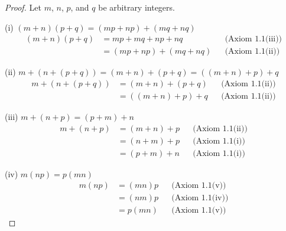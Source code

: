 \begin{proof}
    Let $m$, $n$, $p$, and $q$ be arbitrary integers.

    (i) $(m + n)(p + q) = (mp + np) + (mq + nq)$
    \begin{align*}
        (m + n)(p + q) & = mp + mq + np + nq     &  & \text{(Axiom 1.1(iii))} \\
                       & = (mp + np) + (mq + nq) &  & \text{(Axiom 1.1(ii))}
    \end{align*}

    (ii) $m + (n + (p + q)) = (m + n) + (p + q) = ((m + n) + p) + q$
    \begin{align*}
        m + (n + (p + q)) & = (m + n) + (p + q) &  & \text{(Axiom 1.1(ii))} \\
                          & = ((m + n) + p) + q &  & \text{(Axiom 1.1(ii))}
    \end{align*}

    (iii) $m + (n + p) = (p + m) + n$
    \begin{align*}
        m + (n + p) & = (m + n) + p &  & \text{(Axiom 1.1(ii))} \\
                    & = (n + m) + p &  & \text{(Axiom 1.1(i))}  \\
                    & = (p + m) + n &  & \text{(Axiom 1.1(i))}
    \end{align*}

    (iv) $m(np) = p(mn)$
    \begin{align*}
        m(np) & = (mn)p &  & \text{(Axiom 1.1(v))}  \\
              & = (nm)p &  & \text{(Axiom 1.1(iv))} \\
              & = p(mn) &  & \text{(Axiom 1.1(v))}
    \end{align*}


\end{proof}

